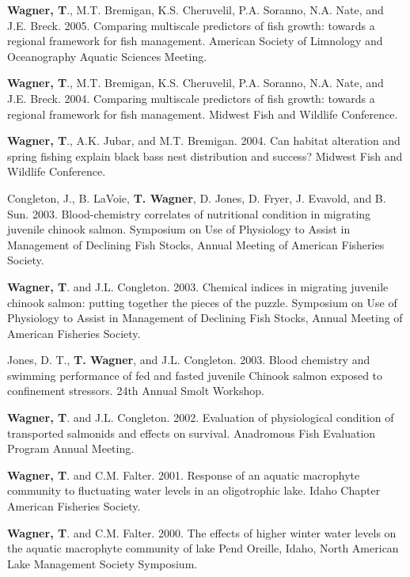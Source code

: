 \documentclass[10pt]{article}
\begin{document}
\begin{flushleft}
\begin{etaremune}
\item {\bf Wagner, T}., M.T. Bremigan, K.S. Cheruvelil, P.A. Soranno, N.A. Nate, and J.E. Breck. 2005. Comparing multiscale predictors of fish growth: towards a regional framework for fish management. American Society of Limnology and Oceanography Aquatic Sciences Meeting. 


\item {\bf Wagner, T}., M.T. Bremigan, K.S. Cheruvelil, P.A. Soranno, N.A. Nate, and J.E. Breck. 2004. Comparing multiscale predictors of fish growth: towards a regional framework for fish management. Midwest Fish and Wildlife Conference.

\item {\bf Wagner, T}., A.K. Jubar, and M.T. Bremigan. 2004. Can habitat alteration and spring fishing explain black bass nest distribution and success? Midwest Fish and Wildlife Conference.


\item Congleton, J., B. LaVoie, {\bf T. Wagner}, D. Jones, D. Fryer, J. Evavold, and B. Sun. 2003. Blood-chemistry correlates of nutritional condition in migrating juvenile chinook salmon. Symposium on Use of Physiology to Assist in Management of Declining Fish Stocks, Annual Meeting of American Fisheries Society.

\item {\bf Wagner, T}. and J.L. Congleton. 2003. Chemical indices in migrating juvenile chinook salmon: putting together the pieces of the puzzle. Symposium on Use of Physiology to Assist in Management of Declining Fish Stocks, Annual Meeting of American Fisheries Society.

\item Jones, D. T., {\bf T. Wagner}, and J.L. Congleton. 2003. Blood chemistry and swimming performance of fed and fasted juvenile Chinook salmon exposed to confinement stressors. 24th Annual Smolt Workshop.


\item {\bf Wagner, T}. and J.L. Congleton. 2002. Evaluation of physiological condition of transported salmonids and effects on survival. Anadromous Fish Evaluation Program Annual Meeting.


\item {\bf Wagner, T}. and C.M. Falter. 2001. Response of an aquatic macrophyte community to fluctuating water levels in an oligotrophic lake. Idaho Chapter American Fisheries Society.


\item {\bf Wagner, T}. and C.M. Falter. 2000. The effects of higher winter water levels on the aquatic macrophyte community of lake Pend Oreille, Idaho, North American Lake Management Society Symposium. 



\end{etaremune}
\end{flushleft}
\end{document}
